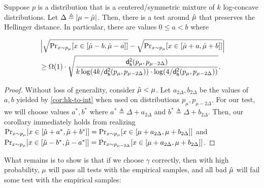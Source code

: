 \begin{corollary}\label{cor:test-exists}
    Suppose $p$ is a distribution that is a centered/symmetric mixture of $k$ log-concave distributions.  Let $\Delta \triangleq |\mu - \hat{\mu}|$. Then, there is a test around $\hat{\mu}$ that preserves the Hellinger distance. In particular, there are values $0 \le a < b$ where

    \begin{align*}
        & \left| \sqrt{\operatorname{{Pr}}_{x \sim p_{\mu}}[x \in [\hat{\mu}-b,\hat{\mu}-a]]} -  \sqrt{\operatorname{{Pr}}_{x \sim p_{\mu}}[x \in [\hat{\mu}+a,\hat{\mu}+b]]} \right| \\
        & \ge \Omega(1) \cdot \sqrt{\frac{\mathsf{d_{h}^2}(p_{\mu},p_{\mu-2\Delta})}{k \log(4k/\mathsf{d_{h}^2}(p_{\mu},p_{\mu-2\Delta})) \cdot \log(4/\mathsf{d_{h}^2}(p_{\mu},p_{\mu-2\Delta}))}}.
    \end{align*}
\end{corollary}
\begin{proof}
    Without loss of generality, consider $\hat{\mu} < \mu$. Let $a_{2 \Delta},b_{2 \Delta}$ be the values of $a,b$ yielded by \cref{cor:hk-to-int} when used on distributions $p_\mu,p_{\mu-2\Delta}$. For our test, we will choose values $a^*,b^*$ where $a^* \triangleq \Delta + a_{2\Delta}$ and $b^* \triangleq \Delta + b_{2\Delta}$. Then, our corollary immediately holds from realizing $\operatorname{{Pr}}_{x \sim p_{\mu}}[x \in [\hat{\mu}+a^*,\hat{\mu}+b^*]] = \operatorname{{Pr}}_{x \sim p_{\mu}}[x \in [\mu+a_{2\Delta},\mu+b_{2\Delta}]]$ and $\operatorname{{Pr}}_{x \sim p_{\mu}}[x \in [\hat{\mu}-b^*,\hat{\mu}-a^*]] = \operatorname{{Pr}}_{x \sim p_{\mu-2\Delta}}[x \in [\mu+a_{2\Delta},\mu+b_{2\Delta}]]$.
\end{proof}

What remains is to show is that if we choose $\gamma$ correctly, then with high probability, $\mu$ will pass all tests with the empirical samples, and all bad $\hat{\mu}$ will fail some test with the empirical samples:

